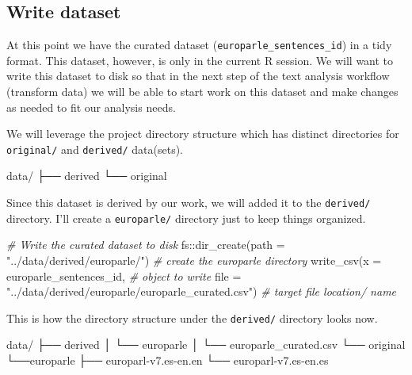 \documentclass[
  letterpaper,
]{latex/krantz}
\newenvironment{Shaded}{\begin{snugshade}}{\end{snugshade}}
\newcommand{\AttributeTok}[1]{\textcolor[rgb]{0.00,0.00,0.00}{#1}}
\newcommand{\CommentTok}[1]{\textcolor[rgb]{0.00,0.00,0.00}{\textit{#1}}}
\newcommand{\ExtensionTok}[1]{\textcolor[rgb]{0.00,0.00,0.00}{#1}}
\newcommand{\FunctionTok}[1]{\textcolor[rgb]{0.00,0.00,0.00}{#1}}
\newcommand{\NormalTok}[1]{\textcolor[rgb]{0.00,0.00,0.00}{#1}}
\newcommand{\SpecialCharTok}[1]{\textcolor[rgb]{0.00,0.00,0.00}{#1}}
\newcommand{\StringTok}[1]{\textcolor[rgb]{0.00,0.00,0.00}{#1}}
\begin{document}
\hypertarget{write-dataset}{%
\subsection{Write dataset}\label{write-dataset}}

At this point we have the curated dataset
(\texttt{europarle\_sentences\_id}) in a tidy format. This dataset,
however, is only in the current R session. We will want to write this
dataset to disk so that in the next step of the text analysis workflow
(transform data) we will be able to start work on this dataset and make
changes as needed to fit our analysis needs.

We will leverage the project directory structure which has distinct
directories for \texttt{original/} and \texttt{derived/} data(sets).

\begin{Shaded}
\begin{Highlighting}[]
\ExtensionTok{data/}
\ExtensionTok{├──}\NormalTok{ derived}
\ExtensionTok{└──}\NormalTok{ original}
\end{Highlighting}
\end{Shaded}

Since this dataset is derived by our work, we will added it to the
\texttt{derived/} directory. I'll create a \texttt{europarle/} directory
just to keep things organized.

\begin{Shaded}
\begin{Highlighting}[]
\CommentTok{\# Write the curated dataset to disk}
\NormalTok{fs}\SpecialCharTok{::}\FunctionTok{dir\_create}\NormalTok{(}\AttributeTok{path =} \StringTok{"../data/derived/europarle/"}\NormalTok{) }\CommentTok{\# create the europarle directory}
\FunctionTok{write\_csv}\NormalTok{(}\AttributeTok{x =}\NormalTok{ europarle\_sentences\_id, }\CommentTok{\# object to write}
          \AttributeTok{file =} \StringTok{"../data/derived/europarle/europarle\_curated.csv"}\NormalTok{) }\CommentTok{\# target file location/ name}
\end{Highlighting}
\end{Shaded}

This is how the directory structure under the \texttt{derived/}
directory looks now.

\begin{Shaded}
\begin{Highlighting}[]
\ExtensionTok{data/}
\ExtensionTok{├──}\NormalTok{ derived}
\ExtensionTok{│}\NormalTok{   └── europarle}
\ExtensionTok{│}\NormalTok{       └── europarle\_curated.csv}
\ExtensionTok{└──}\NormalTok{ original}
    \ExtensionTok{└──europarle}
        \ExtensionTok{├──}\NormalTok{ europarl{-}v7.es{-}en.en}
        \ExtensionTok{└──}\NormalTok{ europarl{-}v7.es{-}en.es}
\end{Highlighting}
\end{Shaded}
\end{document}
